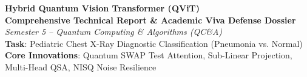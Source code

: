\documentclass[11pt,a4paper]{article}
\begin{document}
\begin{center}
    {\LARGE \textbf{Hybrid Quantum Vision Transformer (QViT)}}\\[4pt]
    {\large \textbf{Comprehensive Technical Report \& Academic Viva Defense Dossier}}\\[3pt]
    \textit{Semester 5 -- Quantum Computing \& Algorithms (QC\&A)} \\
    \textbf{Task}: Pediatric Chest X-Ray Diagnostic Classification (Pneumonia vs. Normal) \\
    \textbf{Core Innovations}: Quantum SWAP Test Attention, Sub-Linear Projection, Multi-Head QSA, NISQ Noise Resilience
\end{center}

\vspace{0.2cm}
\end{document}
